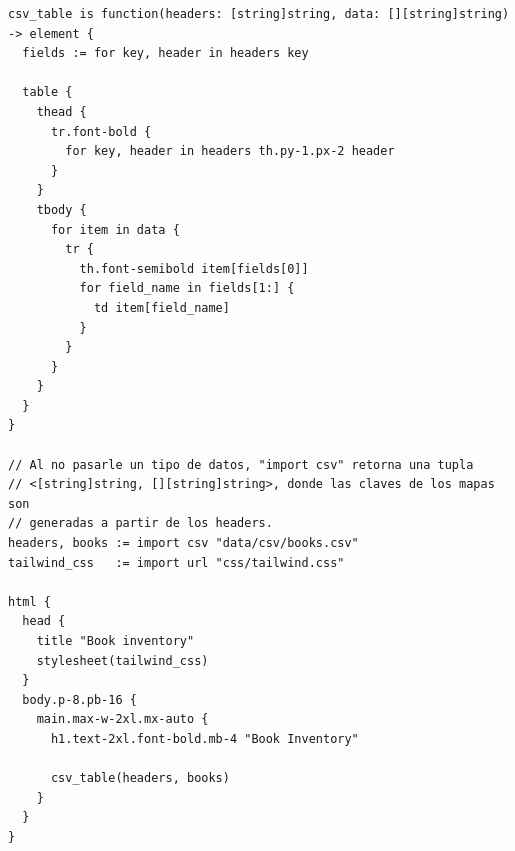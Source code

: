 \scriptsize
\begin{verbatim}
csv_table is function(headers: [string]string, data: [][string]string) -> element {
  fields := for key, header in headers key

  table {
    thead {
      tr.font-bold {
        for key, header in headers th.py-1.px-2 header
      }
    }
    tbody {
      for item in data {
        tr {
          th.font-semibold item[fields[0]]
          for field_name in fields[1:] {
            td item[field_name]
          }
        }
      }
    }
  }
}

// Al no pasarle un tipo de datos, "import csv" retorna una tupla
// <[string]string, [][string]string>, donde las claves de los mapas son
// generadas a partir de los headers.
headers, books := import csv "data/csv/books.csv"
tailwind_css   := import url "css/tailwind.css"

html {
  head {
    title "Book inventory"
    stylesheet(tailwind_css)
  }
  body.p-8.pb-16 {
    main.max-w-2xl.mx-auto {
      h1.text-2xl.font-bold.mb-4 "Book Inventory"

      csv_table(headers, books)
    }
  }
}
\end{verbatim}
\normalsize


